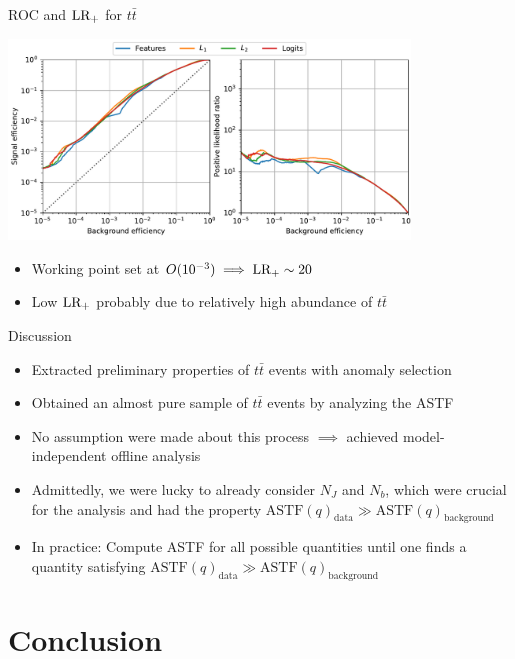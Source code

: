 \documentclass{beamer}
\begin{document}
\begin{frame}{ROC and $\textup{LR}_+$ for $t\bar{t}$}
\begin{center}
\includegraphics[width=0.8\textwidth]{roc-tt.pdf}
\end{center}
\begin{itemize}
    \item<1-> Working point set at $O(10^{-3}) \implies \textup{LR}_+ \sim 20$ 
    \item<2-> Low $\textup{LR}_+$ probably due to relatively high abundance of $t\bar{t}$
\end{itemize}
\end{frame}

\begin{frame}{Discussion}

\begin{itemize}
    \item<1-> Extracted preliminary properties of $t\bar{t}$ events with anomaly selection
    \item<2-> Obtained an almost pure sample of $t\bar{t}$ events by analyzing the ASTF
    \item<3-> No assumption were made about this process $\implies$ achieved model-independent offline analysis
    \item<4-> Admittedly, we were lucky to already consider $N_J$ and $N_b$, which were crucial for the analysis and had the property $\text{ASTF}(q)_{\text{data}} \gg \text{ASTF}(q)_{\text{background}}$
    \item<5-> In practice: Compute ASTF for all possible quantities until one finds a quantity satisfying $\text{ASTF}(q)_{\text{data}} \gg \text{ASTF}(q)_{\text{background}}$
\end{itemize}
\end{frame}


\section{Conclusion}
\end{document}
